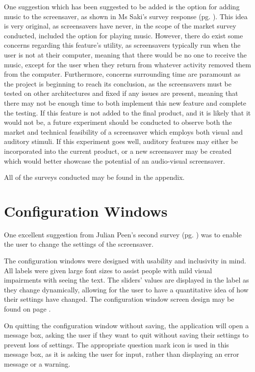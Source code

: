 \documentclass[10pt, openany]{book}
\begin{document}
One suggestion which has been suggested to be added is the option for adding music to the screensaver, as shown in Ms Saki's survey response (pg. \pageref{app:survey-aartee}). This idea is very original, as screensavers have never, in the scope of the market survey conducted, included the option for playing music. However, there do exist some concerns regarding this feature's utility, as screensavers typically run when the user is not at their computer, meaning that there would be no one to receive the music, except for the user when they return from whatever activity removed them from the computer. Furthermore, concerns surrounding time are paramount as the project is beginning to reach its conclusion, as the screensavers must be tested on other architectures and fixed if any issues are present, meaning that there may not be enough time to both implement this new feature and complete the testing. If this feature is not added to the final product, and it is likely that it would not be, a future experiment should be conducted to observe both the market and technical feasibility of a screensaver which employs both visual and auditory stimuli. If this experiment goes well, auditory features may either be incorporated into the current product, or a new screensaver may be created which would better showcase the potential of an audio-visual screensaver.

All of the surveys conducted may be found in the appendix.

\section{Configuration Windows}

One excellent suggestion from Julian Peen's second survey (pg. \pageref{app:survey-julian-2}) was to enable the user to change the settings of the screensaver.

The configuration windows were designed with usability and inclusivity in mind. All labels were given large font sizes to assist people with mild visual impairments with seeing the text. The sliders' values are displayed in the label as they change dynamically, allowing for the user to have a quantitative idea of how their settings have changed. The configuration window screen design may be found on page \pageref{app:config-screen}.

On quitting the configuration window without saving, the application will open a message box, asking the user if they want to quit without saving their settings to prevent loss of settings. The appropriate question mark icon is used in this message box, as it is asking the user for input, rather than displaying an error message or a warning.
\end{document}
